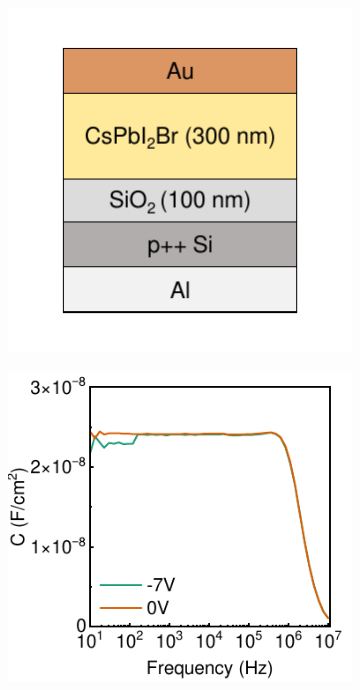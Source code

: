 \begin{figure}[htbp]
    \centering
    \begin{subfigure}[t]{0.4\textwidth} %
        \centering
        \includegraphics[width=\textwidth]{chapters/transport_layers/images/MOS_Structure_icon.pdf} %
        \caption{}
        \label{}
    \end{subfigure}
    \hspace{0.5cm}
    \begin{subfigure}[t]{0.4\textwidth} %
        \centering
        \includegraphics[width=\textwidth]{chapters/transport_layers/images/MOS_IS.pdf} %
        \caption{}
        \label{}
    \end{subfigure}


\end{figure}
